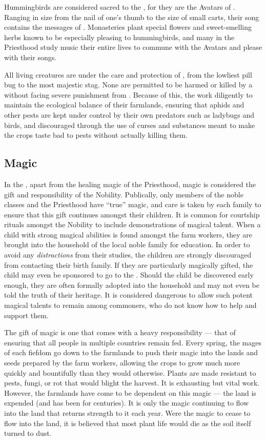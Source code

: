 \documentclass[blue]{GL2020}
\begin{document}
Hummingbirds are considered sacred to the \pFarmers{}, for they are the Avatars of \cFarmGod{}. Ranging in size from the nail of one's thumb to the size of small carts, their song contains the messages of \cFarmGod{}. Monasteries plant special flowers and sweet-smelling herbs known to be especially pleasing to hummingbirds, and many in the Priesthood study music their entire lives to commune with the Avatars and please \cFarmGod{} with their songs.

All living creatures are under the care and protection of \cFarmGod{}, from the lowliest pill bug to the most majestic stag. None are permitted to be harmed or killed by a \pFarmer{} without facing severe punishment from \cFarmGod{}. Because of this, the \pFarm{} work diligently to maintain the ecological balance of their farmlands, ensuring that aphids and other pests are kept under control by their own predators such as ladybugs and birds, and discouraged through the use of curses and substances meant to make the crops taste bad to pests without actually killing them.

\subsection*{Magic}
In the \pFarm{}, apart from the healing magic of the Priesthood, magic is considered the gift and responsibility of the Nobility. Publically, only members of the noble classes and the Priesthood have ``true'' magic, and care is taken by each family to ensure that this gift continues amongst their children. It is common for courtship rituals amongst the Nobility to include demonstrations of magical talent. When a child with strong magical abilities is found amongst the farm workers, they are brought into the household of the local noble family for education. In order to avoid any \emph{distractions} from their studies, the children are strongly discouraged from contacting their birth family. If they are particularly magically gifted, the child may even be sponsored to go to the \pSchool{}. Should the child be discovered early enough, they are often formally adopted into the household and may not even be told the truth of their heritage. It is considered dangerous to allow such potent magical talents to remain among commoners, who do not know how to help and support them.  

The gift of magic is one that comes with a heavy responsibility — that of ensuring that all people in multiple countries remain fed. Every spring, the mages of each fiefdom go down to the farmlands to push their magic into the lands and seeds prepared by the farm workers, allowing the crops to grow much more quickly and bountifully than they would otherwise. Plants are made resistant to pests, fungi, or rot that would blight the harvest. It is exhausting but vital work.  However, the farmlands have come to be dependent on this magic — the land is expended (and has been for centuries). It is only the magic continuing to flow into the land that returns strength to it each year. Were the magic to cease to flow into the land, it is believed that most plant life would die as the soil itself turned to dust.
\end{document}
